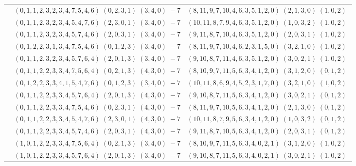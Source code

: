 \documentclass[11pt]{article}
\begin{document}
\begin{longtable}[l]{|c|c|c|}
 \cline{2-3} 
 & $(0 ,1 ,1 ,2 ,3 ,2 ,3 ,4 ,7 ,5 ,4 ,6) \;(0 ,2 ,3 ,1) \;(3 ,4 ,0) \;-7$ & $(8 ,11 ,9 ,7 ,10 ,4 ,6 ,3 ,5 ,1 ,2 ,0) \;(2 ,1 ,3 ,0) \;(1 ,0 ,2) \;$\\ 
 \cline{2-3} 
 & $(0 ,1 ,1 ,2 ,3 ,2 ,3 ,4 ,5 ,4 ,7 ,6) \;(2 ,3 ,0 ,1) \;(3 ,4 ,0) \;-7$ & $(10 ,11 ,8 ,7 ,9 ,4 ,6 ,3 ,5 ,1 ,2 ,0) \;(1 ,0 ,3 ,2) \;(1 ,0 ,2) \;$\\ 
 \cline{2-3} 
 & $(0 ,1 ,1 ,2 ,3 ,2 ,3 ,4 ,5 ,7 ,4 ,6) \;(2 ,0 ,3 ,1) \;(3 ,4 ,0) \;-7$ & $(9 ,11 ,8 ,7 ,10 ,4 ,6 ,3 ,5 ,1 ,2 ,0) \;(2 ,0 ,3 ,1) \;(1 ,0 ,2) \;$\\ 
 \cline{2-3} 
 & $(0 ,1 ,2 ,2 ,3 ,1 ,3 ,4 ,7 ,5 ,4 ,6) \;(0 ,1 ,2 ,3) \;(3 ,4 ,0) \;-7$ & $(8 ,11 ,9 ,7 ,10 ,4 ,6 ,2 ,3 ,1 ,5 ,0) \;(3 ,2 ,1 ,0) \;(1 ,0 ,2) \;$\\ 
 \cline{2-3} 
 & $(0 ,1 ,1 ,2 ,3 ,2 ,3 ,4 ,5 ,7 ,6 ,4) \;(2 ,0 ,1 ,3) \;(3 ,4 ,0) \;-7$ & $(9 ,10 ,8 ,7 ,11 ,4 ,6 ,3 ,5 ,1 ,2 ,0) \;(3 ,0 ,2 ,1) \;(1 ,0 ,2) \;$\\ 
 \cline{2-3} 
 & $(0 ,1 ,1 ,2 ,2 ,3 ,3 ,4 ,7 ,5 ,6 ,4) \;(0 ,2 ,1 ,3) \;(4 ,3 ,0) \;-7$ & $(8 ,10 ,9 ,7 ,11 ,5 ,6 ,3 ,4 ,1 ,2 ,0) \;(3 ,1 ,2 ,0) \;(0 ,1 ,2) \;$\\ 
 \cline{2-3} 
 & $(0 ,1 ,2 ,2 ,3 ,3 ,4 ,1 ,5 ,4 ,7 ,6) \;(0 ,1 ,2 ,3) \;(3 ,4 ,0) \;-7$ & $(10 ,11 ,8 ,6 ,9 ,4 ,5 ,2 ,3 ,1 ,7 ,0) \;(3 ,2 ,1 ,0) \;(1 ,0 ,2) \;$\\ 
 \cline{2-3} 
 & $(0 ,1 ,1 ,2 ,2 ,3 ,3 ,4 ,5 ,7 ,6 ,4) \;(2 ,0 ,1 ,3) \;(4 ,3 ,0) \;-7$ & $(9 ,10 ,8 ,7 ,11 ,5 ,6 ,3 ,4 ,1 ,2 ,0) \;(3 ,0 ,2 ,1) \;(0 ,1 ,2) \;$\\ 
 \cline{2-3} 
 & $(0 ,1 ,1 ,2 ,2 ,3 ,3 ,4 ,7 ,5 ,4 ,6) \;(0 ,2 ,3 ,1) \;(4 ,3 ,0) \;-7$ & $(8 ,11 ,9 ,7 ,10 ,5 ,6 ,3 ,4 ,1 ,2 ,0) \;(2 ,1 ,3 ,0) \;(0 ,1 ,2) \;$\\ 
 \cline{2-3} 
 & $(0 ,1 ,1 ,2 ,2 ,3 ,3 ,4 ,5 ,4 ,7 ,6) \;(2 ,3 ,0 ,1) \;(4 ,3 ,0) \;-7$ & $(10 ,11 ,8 ,7 ,9 ,5 ,6 ,3 ,4 ,1 ,2 ,0) \;(1 ,0 ,3 ,2) \;(0 ,1 ,2) \;$\\ 
 \cline{2-3} 
 & $(0 ,1 ,1 ,2 ,2 ,3 ,3 ,4 ,5 ,7 ,4 ,6) \;(2 ,0 ,3 ,1) \;(4 ,3 ,0) \;-7$ & $(9 ,11 ,8 ,7 ,10 ,5 ,6 ,3 ,4 ,1 ,2 ,0) \;(2 ,0 ,3 ,1) \;(0 ,1 ,2) \;$\\ 
 \cline{2-3} 
 & $(1 ,0 ,1 ,2 ,2 ,3 ,3 ,4 ,7 ,5 ,6 ,4) \;(0 ,2 ,1 ,3) \;(3 ,4 ,0) \;-7$ & $(8 ,10 ,9 ,7 ,11 ,5 ,6 ,3 ,4 ,0 ,2 ,1) \;(3 ,1 ,2 ,0) \;(1 ,0 ,2) \;$\\ 
 \cline{2-3} 
 & $(1 ,0 ,1 ,2 ,2 ,3 ,3 ,4 ,5 ,7 ,6 ,4) \;(2 ,0 ,1 ,3) \;(3 ,4 ,0) \;-7$ & $(9 ,10 ,8 ,7 ,11 ,5 ,6 ,3 ,4 ,0 ,2 ,1) \;(3 ,0 ,2 ,1) \;(1 ,0 ,2) \;$\\ 

\end{longtable}
\end{document}
